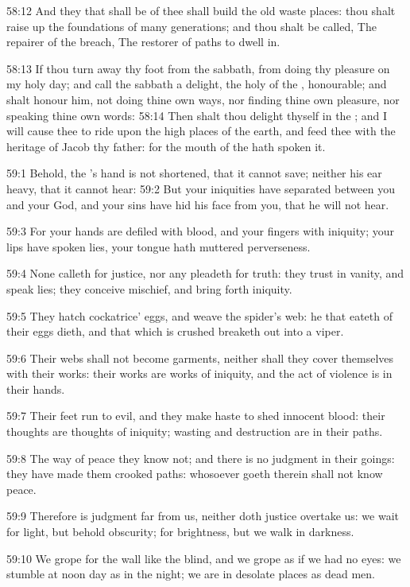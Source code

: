 58:12 And they that shall be of thee shall build the old waste places:
thou shalt raise up the foundations of many generations; and thou
shalt be called, The repairer of the breach, The restorer of paths to
dwell in.

58:13 If thou turn away thy foot from the sabbath, from doing thy
pleasure on my holy day; and call the sabbath a delight, the holy of
the \LORD, honourable; and shalt honour him, not doing thine own ways,
nor finding thine own pleasure, nor speaking thine own words: 58:14
Then shalt thou delight thyself in the \LORD; and I will cause thee to
ride upon the high places of the earth, and feed thee with the
heritage of Jacob thy father: for the mouth of the \LORD hath spoken
it.

59:1 Behold, the \LORD's hand is not shortened, that it cannot save;
neither his ear heavy, that it cannot hear: 59:2 But your iniquities
have separated between you and your God, and your sins have hid his
face from you, that he will not hear.

59:3 For your hands are defiled with blood, and your fingers with
iniquity; your lips have spoken lies, your tongue hath muttered
perverseness.

59:4 None calleth for justice, nor any pleadeth for truth: they trust
in vanity, and speak lies; they conceive mischief, and bring forth
iniquity.

59:5 They hatch cockatrice' eggs, and weave the spider's web: he that
eateth of their eggs dieth, and that which is crushed breaketh out
into a viper.

59:6 Their webs shall not become garments, neither shall they cover
themselves with their works: their works are works of iniquity, and
the act of violence is in their hands.

59:7 Their feet run to evil, and they make haste to shed innocent
blood: their thoughts are thoughts of iniquity; wasting and
destruction are in their paths.

59:8 The way of peace they know not; and there is no judgment in their
goings: they have made them crooked paths: whosoever goeth therein
shall not know peace.

59:9 Therefore is judgment far from us, neither doth justice overtake
us: we wait for light, but behold obscurity; for brightness, but we
walk in darkness.

59:10 We grope for the wall like the blind, and we grope as if we had
no eyes: we stumble at noon day as in the night; we are in desolate
places as dead men.

